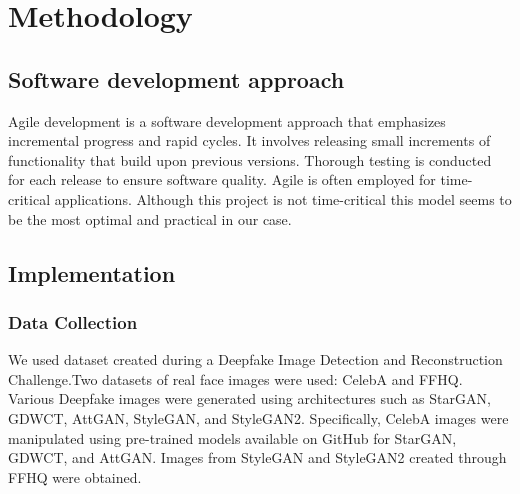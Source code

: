     \chapter{Methodology}
       \section{Software development approach}
        Agile development is a software development approach that emphasizes incremental progress and rapid cycles. It involves releasing small increments of functionality that build upon previous versions. Thorough testing is conducted for each release to ensure software quality. Agile is often employed for time-critical applications. Although this project is not time-critical this model seems to be the most optimal and practical in our case.
        \begin{figure}[hbt!]
        \end{figure}

        \pagebreak

        \section{Implementation}
        \subsection{Data Collection}
        We used dataset created during a Deepfake Image Detection and Reconstruction Challenge.Two datasets of real face images were used: CelebA and FFHQ. Various Deepfake images were generated using architectures such as StarGAN, GDWCT, AttGAN, StyleGAN, and StyleGAN2. Specifically, CelebA images were manipulated using pre-trained models available on GitHub for StarGAN, GDWCT, and AttGAN. Images from StyleGAN and StyleGAN2 created through FFHQ were obtained.
        
